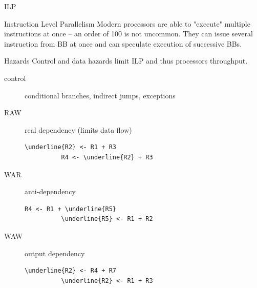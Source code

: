 \documentclass[8pt]{beamer}
\begin{document}
\begin{frame}[fragile]{ILP}
  \begin{block}{Instruction Level Parallelism}
    Modern processors are able to "execute" multiple instructions at once -- an
    order of 100 is not uncommon. They can issue several instruction from BB at
    once and can speculate execution of successive BBs.
  \end{block}

  \begin{block}{Hazards}
    Control and data hazards limit ILP and thus processors throughput.
    \begin{description}
      \item[control] conditional branches, indirect jumps, exceptions
      \item[RAW] real dependency (limits data flow)
        \begin{Verbatim}[commandchars=\\\{\}]
          \underline{R2} <- R1 + R3
          R4 <- \underline{R2} + R3
        \end{Verbatim}
      \item[WAR] anti-dependency
        \begin{Verbatim}[commandchars=\\\{\}]
          R4 <- R1 + \underline{R5}
          \underline{R5} <- R1 + R2
        \end{Verbatim}
      \item[WAW] output dependency
        \begin{Verbatim}[commandchars=\\\{\}]
          \underline{R2} <- R4 + R7
          \underline{R2} <- R1 + R3
        \end{Verbatim}
    \end{description}
  \end{block}
\end{frame}
\end{document}
